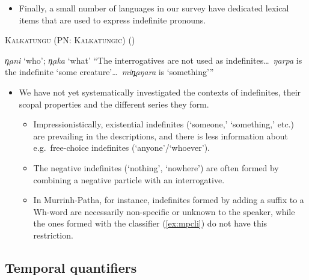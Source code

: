 \documentclass{article}
\begin{document}
\begin{itemize}
\item Finally, a small number of languages in our survey have dedicated lexical items that are used to express indefinite pronouns.
\end{itemize}

\begin{exe}
  \ex \textsc{Kalkatungu (PN: Kalkatungic)} (\citealt[104--5]{blake79})
  \begin{xlist}
    \ex \textit{\charis n̪ani} `who'; \textit{\charis n̪aka} `what'
    \ex ``The interrogatives are not used as indefinites\ldots\ \textit{\charis ŋarpa} is the indefinite `some creature'\ldots\ \textit{\charis min̪aŋara} is `something'\thinspace''
  \end{xlist}
\end{exe}

\begin{itemize}
\item We have not yet systematically investigated the contexts of indefinites, their scopal properties and the different series they form.
  \begin{itemize}
  \item Impressionistically, existential indefinites (`someone,' `something,' etc.) are prevailing in the descriptions, and there is less information about e.g.\ free-choice indefinites (`anyone'/`whoever').
  \item The negative indefinites (`nothing', `nowhere') are often formed by combining a negative particle with an interrogative.%
  \item In Murrinh-Patha, for instance, indefinites formed by adding a suffix to a Wh-word are necessarily non-specific or unknown to the speaker, while the ones formed with the classifier (\ref{ex:mpcli}) do not have this restriction.
  \end{itemize}
\end{itemize}


\subsection{Temporal quantifiers}
\label{sec:temporals}
\end{document}
